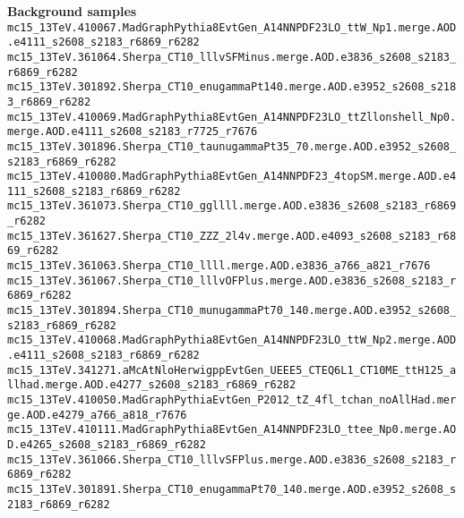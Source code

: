 \textbf{\normalsize{Background samples}}\\
\tiny
\texttt{mc15\_13TeV.410067.MadGraphPythia8EvtGen\_A14NNPDF23LO\_ttW\_Np1.merge.AOD.e4111\_s2608\_s2183\_r6869\_r6282} \\
\texttt{mc15\_13TeV.361064.Sherpa\_CT10\_lllvSFMinus.merge.AOD.e3836\_s2608\_s2183\_r6869\_r6282} \\
\texttt{mc15\_13TeV.301892.Sherpa\_CT10\_enugammaPt140.merge.AOD.e3952\_s2608\_s2183\_r6869\_r6282} \\
\texttt{mc15\_13TeV.410069.MadGraphPythia8EvtGen\_A14NNPDF23LO\_ttZllonshell\_Np0.merge.AOD.e4111\_s2608\_s2183\_r7725\_r7676} \\
\texttt{mc15\_13TeV.301896.Sherpa\_CT10\_taunugammaPt35\_70.merge.AOD.e3952\_s2608\_s2183\_r6869\_r6282} \\
\texttt{mc15\_13TeV.410080.MadGraphPythia8EvtGen\_A14NNPDF23\_4topSM.merge.AOD.e4111\_s2608\_s2183\_r6869\_r6282} \\
\texttt{mc15\_13TeV.361073.Sherpa\_CT10\_ggllll.merge.AOD.e3836\_s2608\_s2183\_r6869\_r6282} \\
\texttt{mc15\_13TeV.361627.Sherpa\_CT10\_ZZZ\_2l4v.merge.AOD.e4093\_s2608\_s2183\_r6869\_r6282} \\
\texttt{mc15\_13TeV.361063.Sherpa\_CT10\_llll.merge.AOD.e3836\_a766\_a821\_r7676} \\
\texttt{mc15\_13TeV.361067.Sherpa\_CT10\_lllvOFPlus.merge.AOD.e3836\_s2608\_s2183\_r6869\_r6282} \\
\texttt{mc15\_13TeV.301894.Sherpa\_CT10\_munugammaPt70\_140.merge.AOD.e3952\_s2608\_s2183\_r6869\_r6282} \\
\texttt{mc15\_13TeV.410068.MadGraphPythia8EvtGen\_A14NNPDF23LO\_ttW\_Np2.merge.AOD.e4111\_s2608\_s2183\_r6869\_r6282} \\
\texttt{mc15\_13TeV.341271.aMcAtNloHerwigppEvtGen\_UEEE5\_CTEQ6L1\_CT10ME\_ttH125\_allhad.merge.AOD.e4277\_s2608\_s2183\_r6869\_r6282} \\
\texttt{mc15\_13TeV.410050.MadGraphPythiaEvtGen\_P2012\_tZ\_4fl\_tchan\_noAllHad.merge.AOD.e4279\_a766\_a818\_r7676} \\
\texttt{mc15\_13TeV.410111.MadGraphPythia8EvtGen\_A14NNPDF23LO\_ttee\_Np0.merge.AOD.e4265\_s2608\_s2183\_r6869\_r6282} \\
\texttt{mc15\_13TeV.361066.Sherpa\_CT10\_lllvSFPlus.merge.AOD.e3836\_s2608\_s2183\_r6869\_r6282} \\
\texttt{mc15\_13TeV.301891.Sherpa\_CT10\_enugammaPt70\_140.merge.AOD.e3952\_s2608\_s2183\_r6869\_r6282} \\

